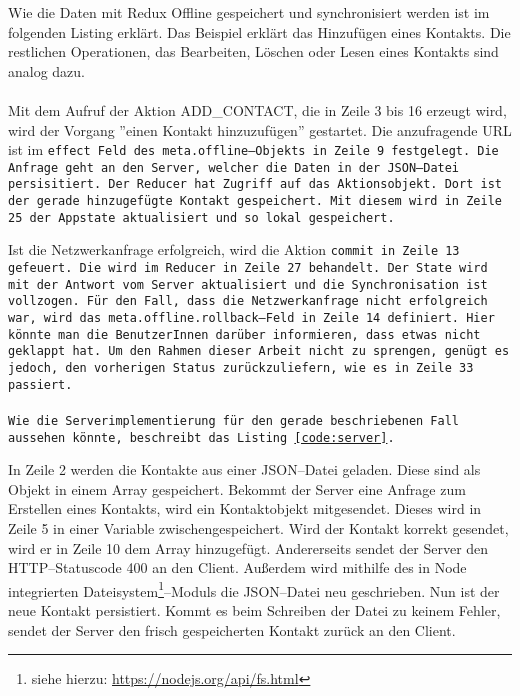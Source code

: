 Wie die Daten mit Redux Offline gespeichert und synchronisiert werden ist im folgenden Listing erklärt.
Das Beispiel erklärt das Hinzufügen eines Kontakts. Die restlichen Operationen, das Bearbeiten, Löschen oder Lesen eines Kontakts sind analog dazu.\\\\
Mit dem Aufruf der Aktion ADD\_CONTACT, die in Zeile 3 bis 16 erzeugt wird, wird der Vorgang ''einen Kontakt hinzuzufügen'' gestartet.
Die anzufragende URL ist im \tt{effect} Feld des \tt{meta.offline}--Objekts in Zeile 9 festgelegt.
Die Anfrage geht an den Server, welcher die Daten in der \gls{JSON}--Datei persisitiert.
Der Reducer hat Zugriff auf das Aktionsobjekt. Dort ist der gerade hinzugefügte Kontakt gespeichert.
Mit diesem wird in Zeile 25 der \gls{App}state aktualisiert und so lokal gespeichert.
%
\begin{center}  
\end{center}
%
Ist die Netzwerkanfrage erfolgreich, wird die Aktion \tt{commit} in Zeile 13 gefeuert.
Die wird im Reducer in Zeile 27 behandelt. Der State wird mit der Antwort vom Server aktualisiert und die Synchronisation ist vollzogen.
Für den Fall, dass die Netzwerkanfrage nicht erfolgreich war, wird das \tt{meta.offline.rollback}--Feld in Zeile 14 definiert.
Hier könnte man die BenutzerInnen darüber informieren, dass etwas nicht geklappt hat.
Um den Rahmen dieser Arbeit nicht zu sprengen, genügt es jedoch, den vorherigen Status zurückzuliefern, wie es in Zeile 33 passiert.\\\\
Wie die Serverimplementierung für den gerade beschriebenen Fall aussehen könnte, beschreibt das Listing \ref{code:server}.
%
\begin{center}  
\end{center}
%
In Zeile 2 werden die Kontakte aus einer \gls{JSON}--Datei geladen. Diese sind als Objekt in einem Array gespeichert.
Bekommt der Server eine Anfrage zum Erstellen eines Kontakts, wird ein Kontaktobjekt mitgesendet. Dieses wird in Zeile 5 in einer Variable zwischengespeichert. 
Wird der Kontakt korrekt gesendet, wird er in Zeile 10 dem Array hinzugefügt.
Andererseits sendet der Server den \gls{HTTP}--Statuscode 400 an den Client. %
Außerdem wird mithilfe des in Node integrierten Dateisystem\footnote{siehe hierzu: \url{https://nodejs.org/api/fs.html}}--Moduls die \gls{JSON}--Datei neu geschrieben.
Nun ist der neue Kontakt persistiert. Kommt es beim Schreiben der Datei zu keinem Fehler, sendet der Server den frisch gespeicherten Kontakt zurück an den Client.